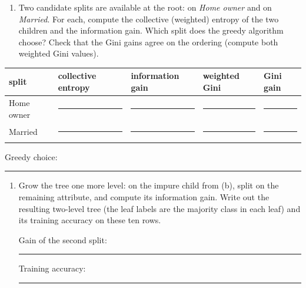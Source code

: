 \documentclass[
  11pt,
]{article}
\newcounter{none} %
\providecommand{\tightlist}{%
  \setlength{\itemsep}{0pt}\setlength{\parskip}{0pt}}
\newcommand{\answerspace}[1]{\par\vspace*{#1}}  %
\newcommand{\blank}[1][1.2in]{\rule{#1}{0.4pt}}
\newcommand{\answerpage}{\clearpage}
\begin{document}
\answerspace{1.8in}
\answerpage

\begin{enumerate}
\def\labelenumi{(\alph{enumi})}
\setcounter{enumi}{1}
\tightlist
\item
  Two candidate splits are available at the root: on \emph{Home owner}
  and on \emph{Married}. For each, compute the collective (weighted)
  entropy of the two children and the information gain. Which split does
  the greedy algorithm choose? Check that the Gini gains agree on the
  ordering (compute both weighted Gini values).
\end{enumerate}

{\def\LTcaptype{none} %
\begin{longtable}[]{@{}
  >{\raggedright\arraybackslash}p{}
  >{\raggedright\arraybackslash}p{}
  >{\raggedright\arraybackslash}p{}
  >{\raggedright\arraybackslash}p{}
  >{\raggedright\arraybackslash}p{}@{}}
\toprule\noalign{}
\begin{minipage}[b]{\linewidth}\raggedright
split
\end{minipage} & \begin{minipage}[b]{\linewidth}\raggedright
collective entropy
\end{minipage} & \begin{minipage}[b]{\linewidth}\raggedright
information gain
\end{minipage} & \begin{minipage}[b]{\linewidth}\raggedright
weighted Gini
\end{minipage} & \begin{minipage}[b]{\linewidth}\raggedright
Gini gain
\end{minipage} \\
\midrule\noalign{}
\endhead
\bottomrule\noalign{}
\endlastfoot
Home owner & \blank[0.9in] & \blank[0.9in] & \blank[0.9in] &
\blank[0.9in] \\
Married & \blank[0.9in] & \blank[0.9in] & \blank[0.9in] &
\blank[0.9in] \\
\end{longtable}
}

Greedy choice: \blank[1.2in]

\answerspace{3.5in}

\begin{enumerate}
\def\labelenumi{(\alph{enumi})}
\setcounter{enumi}{2}
\item
  Grow the tree one more level: on the impure child from (b), split on
  the remaining attribute, and compute its information gain. Write out
  the resulting two-level tree (the leaf labels are the majority class
  in each leaf) and its training accuracy on these ten rows.\nopagebreak

  Gain of the second split: \blank[0.8in]\quad Training accuracy:
  \blank[0.8in]
\end{enumerate}
\end{document}
